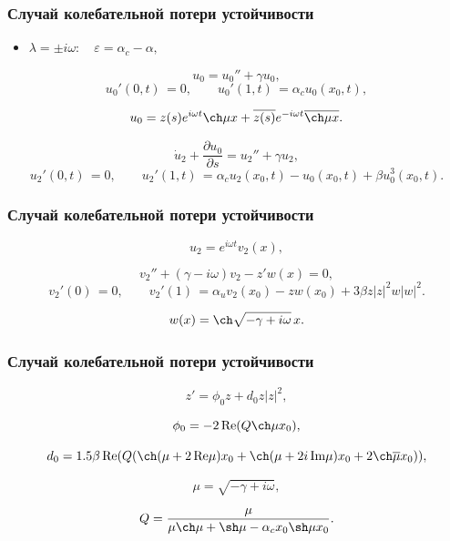 \documentclass[fullscreen=true, unicode, bookmarks=false]{beamer}
\begin{document}
\begin{frame}
\frametitle{ Случай колебательной потери устойчивости }

\begin{itemize}
\item { $ \lambda = \pm i \omega: \quad \varepsilon=\alpha_c-\alpha, $
}
\end{itemize}

\medskip

\begin{equation}
	u_0 = u_0'' + \gamma u_0,
\end{equation}
\begin{equation}
	u_0'(0, t) \, = 0, \qquad u_0'(1, t) \, = \alpha_c u_0(x_0, t),
\end{equation}

$$ u_0 = z(s) e^{i \omega t} \ch \mu x + \overline{z(s)} e^{-i \omega t} \overline{\ch \mu x}. $$

\medskip

\begin{equation}
	\dot u_2 + \frac{\partial u_0}{\partial s} = u_2'' + \gamma u_2,
\end{equation}
\begin{equation}
	u_2'(0, t) \, = 0, \qquad u_2'(1, t) \, = \alpha_c u_2(x_0, t) - u_0(x_0, t) + \beta u_0^3(x_0, t).
\end{equation}

\end{frame}

\begin{frame}
\frametitle{ Случай колебательной потери устойчивости }

$$ u_2 = e^{i \omega t} v_2(x), $$

\bigskip

\begin{equation}
	v_2'' + (\gamma - i \omega) v_2 - z' w(x) = 0,
\end{equation}
\begin{equation}
	v_2'(0) \, = 0, \qquad v_2'(1) \, = \alpha_u v_2(x_0) - z w(x_0) + 3\beta z|z|^2 w|w|^2.
\end{equation}

$$ w(x) = \ch \sqrt{-\gamma + i \omega} \, x. $$

\end{frame}

\begin{frame}
\frametitle{ Случай колебательной потери устойчивости }

\begin{equation}
	z' = \phi_0 z + d_0 z |z|^2,
\end{equation}

\bigskip

$$ \phi_0 = -2 \operatorname{Re} (Q\ch \mu x_0), $$

$$ d_0 = 1.5 \beta \operatorname{Re} (Q ( \ch(\mu + 2\,\mbox{Re}\mu)x_0 + \ch(\mu + 2i\,\mbox{Im}\mu)x_0 + 2\ch\overline{\mu}x_0 )), $$

\bigskip

$$ \mu = \sqrt{-\gamma + i \omega}, $$

$$ Q = \frac{\mu}{\mu \ch \mu + \sh \mu - \alpha_c x_0 \sh \mu x_0}. $$

\end{frame}
\end{document}
